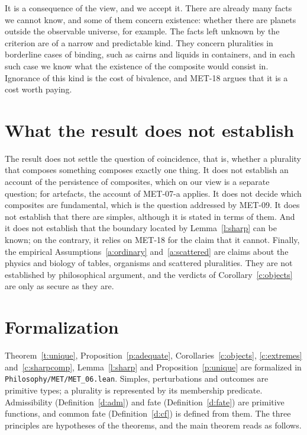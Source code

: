 \documentclass{situationist-preprint}
\begin{document}
\begin{reply}
It is a consequence of the view, and we accept it. There are already many facts we cannot know, and some of them concern existence: whether there are planets outside the observable universe, for example. The facts left unknown by the criterion are of a narrow and predictable kind. They concern pluralities in borderline cases of binding, such as cairns and liquids in containers, and in each such case we know what the existence of the composite would consist in. Ignorance of this kind is the cost of bivalence, and MET-18 argues that it is a cost worth paying.
\end{reply}

\section{What the result does not establish}

The result does not settle the question of coincidence, that is, whether a plurality that composes something composes exactly one thing. It does not establish an account of the persistence of composites, which on our view is a separate question; for artefacts, the account of MET-07-a applies. It does not decide which composites are fundamental, which is the question addressed by MET-09. It does not establish that there are simples, although it is stated in terms of them. And it does not establish that the boundary located by Lemma~\ref{l:sharp} can be known; on the contrary, it relies on MET-18 for the claim that it cannot. Finally, the empirical Assumptions~\ref{a:ordinary} and~\ref{a:scattered} are claims about the physics and biology of tables, organisms and scattered pluralities. They are not established by philosophical argument, and the verdicts of Corollary~\ref{c:objects} are only as secure as they are.

\section{Formalization}

Theorem~\ref{t:unique}, Proposition~\ref{p:adequate}, Corollaries~\ref{c:objects}, \ref{c:extremes} and~\ref{c:sharpcomp}, Lemma~\ref{l:sharp} and Proposition~\ref{p:unique} are formalized in \nolinkurl{Philosophy/MET/MET_06.lean}. Simples, perturbations and outcomes are primitive types; a plurality is represented by its membership predicate. Admissibility (Definition~\ref{d:adm}) and fate (Definition~\ref{d:fate}) are primitive functions, and common fate (Definition~\ref{d:cf}) is defined from them. The three principles are hypotheses of the theorems, and the main theorem reads as follows.
\end{document}

